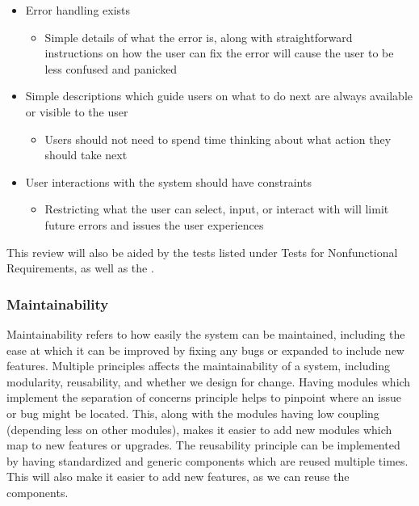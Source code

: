 \documentclass[12pt, titlepage]{article}
\begin{document}
\begin{itemize}
  \item Error handling exists
  \begin{itemize}
    \item Simple details of what the error is, along with straightforward instructions on how the user can fix the error will cause the user to be less confused and panicked
  \end{itemize}
\end{itemize}

\begin{itemize}
  \item Simple descriptions which guide users on what to do next are always available or visible to the user
  \begin{itemize}
    \item Users should not need to spend time thinking about what action they should take next
  \end{itemize}
\end{itemize}

\begin{itemize}
  \item User interactions with the system should have constraints
  \begin{itemize}
    \item Restricting what the user can select, input, or interact with will limit future errors and issues the user experiences
  \end{itemize}
\end{itemize}

This review will also be aided by the  tests listed under Tests for 
Nonfunctional Requirements, as well as the .

\subsubsection{Maintainability}

Maintainability refers to how easily the system can be maintained, including the ease at which 
it can be improved by fixing any bugs or expanded to include new features. Multiple principles 
affects the maintainability of a system, including modularity, reusability, and whether we design 
for change. Having modules which implement the separation of concerns principle helps to pinpoint 
where an issue or bug might be located. This, along with the modules having low coupling 
(depending less on other modules), makes it easier to add new modules which map to new features 
or upgrades. The reusability principle can be implemented by having standardized and generic 
components which are reused multiple times. This will also make it easier to add new features, 
as we can reuse the components.\\
\end{document}
